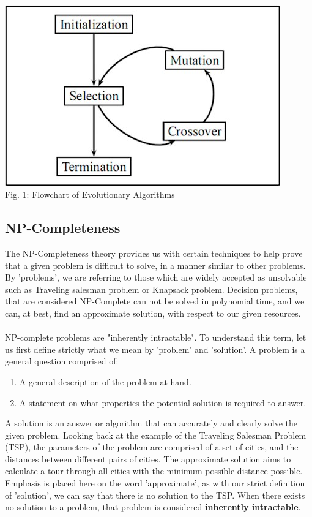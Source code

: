 \documentclass[conference,compsoc]{IEEEtran}
\begin{document}
\paragraph{}
\begin{center}
\includegraphics[scale=0.4]{Report/EAflow.png}\\
    Fig. 1: Flowchart of Evolutionary Algorithms
\end{center}

\subsection{NP-Completeness}
The NP-Completeness theory provides us with certain techniques to help prove that a given problem is difficult to solve, in a manner similar to other problems. By 'problems', we are referring to those which are widely accepted as unsolvable such as Traveling salesman problem or Knapsack problem. Decision problems, that are considered NP-Complete can not be solved in polynomial time, and we can, at best, find an approximate solution, with respect to our given resources.
\\
\\
NP-complete problems are "inherently intractable". To understand this term, let us first define strictly what we mean by 'problem' and 'solution'. A problem is a general question comprised of:
\begin{enumerate}
    \item A general description of the problem at hand.
    \item A statement on what properties the potential solution is required to answer. \cite{garey_johnson_2003}
\end{enumerate}
A solution is an answer or algorithm that can accurately and clearly solve the given problem. Looking back at the example of the Traveling Salesman Problem (TSP), the parameters of the problem are comprised of a set of cities, and the distances between different pairs of cities. The approximate solution aims to calculate a tour through all cities with the minimum possible distance possible. Emphasis is placed here on the word 'approximate', as with our strict definition of 'solution', we can say that there is no solution to the TSP. When there exists no solution to a problem, that problem is considered \textbf{inherently intractable}.
\end{document}
